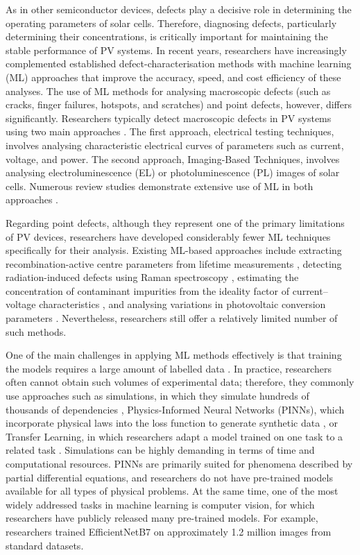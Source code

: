 \documentclass[10pt]{iopart}
\begin{document}
As in other semiconductor devices, defects play a decisive role in determining the operating parameters of solar cells. 
Therefore, diagnosing defects, particularly determining their concentrations, is critically important for maintaining the stable performance of PV systems. 
In recent years, researchers have increasingly complemented established defect-characterisation methods with machine learning (ML) approaches that improve the accuracy, speed, and cost efficiency of these analyses.
The use of ML methods for analysing macroscopic defects (such as cracks, finger failures, hotspots, and scratches) and point defects, however, differs significantly. 
Researchers typically detect macroscopic defects in PV systems using two main approaches \cite{Jia2024, Hijjawi2023}. 
The first approach, electrical testing techniques, involves analysing characteristic electrical curves of parameters such as current, voltage, and power. 
The second approach, Imaging-Based Techniques, involves analysing electroluminescence (EL) \cite{Liu2024a} or photoluminescence (PL) \cite{Doll2021} images of solar cells. 
Numerous review studies demonstrate extensive use of ML in both approaches \cite{Datta2023, Jaiswal2023, Buratti2024, Mahdavipour2022, Hopwood2020, Li2021, Liu2021}.


Regarding point defects, although they represent one of the primary limitations of PV devices, researchers have developed considerably fewer ML techniques specifically for their analysis. 
Existing ML-based approaches include extracting recombination-active centre parameters from lifetime measurements \cite{Wang2024a, Buratti2022, Buratti2020a}, detecting radiation-induced defects using Raman spectroscopy \cite{Park2022, Chia2024}, estimating the concentration of contaminant impurities from the ideality factor of current–voltage characteristics \cite{Olikh2025MSEB}, and analysing variations in photovoltaic conversion parameters \cite{Olikh2025SE}. 
Nevertheless, researchers still offer a relatively limited number of such methods.


One of the main challenges in applying ML methods effectively is that training the models requires a large amount of labelled data \cite{Buratti2024}. 
In practice, researchers often cannot obtain such volumes of experimental data; therefore, they commonly use approaches such as simulations, in which they simulate hundreds of thousands of dependencies \cite{Wang2024a, Buratti2022, Buratti2020a, Olikh2025MSEB, Olikh2025SE}, Physics-Informed Neural Networks (PINNs), which incorporate physical laws into the loss function to generate synthetic data \cite{Wang2024b, Li2025}, or Transfer Learning, in which researchers adapt a model trained on one task to a related task \cite{Kaya2019, Kim2023}. 
Simulations can be highly demanding in terms of time and computational resources. 
PINNs are primarily suited for phenomena described by partial differential equations, and researchers do not have pre-trained models available for all types of physical problems. 
At the same time, one of the most widely addressed tasks in machine learning is computer vision, for which researchers have publicly released many pre-trained models. 
For example, researchers trained EfficientNetB7 on approximately 1.2 million images from standard datasets.
\end{document}

